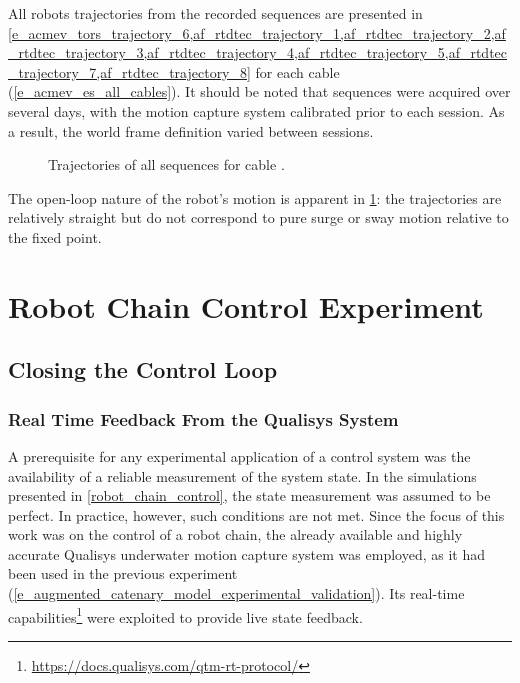 All robots trajectories from the recorded sequences are presented in
\cref{e_acmev_tors_trajectory_6,af_rtdtec_trajectory_1,af_rtdtec_trajectory_2,af_rtdtec_trajectory_3,af_rtdtec_trajectory_4,af_rtdtec_trajectory_5,af_rtdtec_trajectory_7,af_rtdtec_trajectory_8}
for each cable (\cref{e_acmev_es_all_cables}). It should be noted that sequences were acquired over
several days, with the motion capture system calibrated prior to each session. As a result, the
world frame definition varied between sessions.

\begin{figure}
	\centering
	\caption{Trajectories of all sequences for cable .}
	\label{e_acmev_tors_trajectory_6}
\end{figure}

The open-loop nature of the robot's motion is apparent in \cref{e_acmev_tors_trajectory_6}: the
trajectories are relatively straight but do not correspond to pure surge or sway motion relative to
the fixed point.

\section{Robot Chain Control Experiment}
\label{e_robot_chain_control_experiment}

\subsection{Closing the Control Loop}
\label{e_rcce_closing_the_control_loop}

\subsubsection{Real Time Feedback From the Qualisys System}
\label{e_rcce_ctcl_real_time_feedback_from_qualisys_system}

A prerequisite for any experimental application of a control system was the availability of a
reliable measurement of the system state. In the simulations presented in
\cref{robot_chain_control}, the state measurement was assumed to be perfect. In practice, however,
such conditions are not met. Since the focus of this work was on the control of a robot chain, the
already available and highly accurate Qualisys underwater motion capture system was employed, as it
had been used in the previous experiment
(\cref{e_augmented_catenary_model_experimental_validation}). Its real-time
capabilities\footnote{\url{https://docs.qualisys.com/qtm-rt-protocol/}} were exploited to provide
live state feedback.

